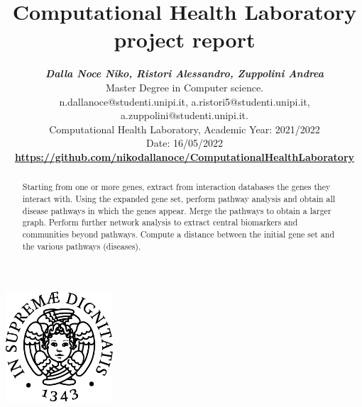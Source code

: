 \documentclass[11pt, letterpaper]{article}  %
\title{\vspace{-2cm}\textbf{Computational Health Laboratory project report}}
\author{\textbf{\small{\textit{Dalla Noce Niko, Ristori Alessandro, Zuppolini Andrea}}} \\ %
        \small{Master Degree in Computer science.}\\ \small{{n.dallanoce@studenti.unipi.it, a.ristori5@studenti.unipi.it, a.zuppolini@studenti.unipi.it}.} \\  %
        \small{Computational Health Laboratory, Academic Year: 2021/2022} \\
        \small{Date: 16/05/2022} \\
       \textbf{\small{\url{https://github.com/nikodallanoce/ComputationalHealthLaboratory}}}
}
\numberwithin{equation}{section}
\begin{document}
\nocite{*}  %
\date{}
\maketitle
\begin{center}
    \includegraphics[width=0.3\textwidth]{images/unipi.png} \\
    \vspace{0.5cm}
\end{center}
\begin{abstract}
Starting from one or more genes, extract from interaction databases the genes they interact with. Using the expanded gene set, perform pathway analysis and obtain all disease pathways in which the genes appear. Merge the pathways to obtain a larger graph. Perform further network analysis to extract central biomarkers and communities beyond pathways. Compute a distance between the initial gene set and the various pathways (diseases).
\end{abstract}
\newpage
\tableofcontents
\newpage
\listoffigures
\newpage
{}








\end{document}
